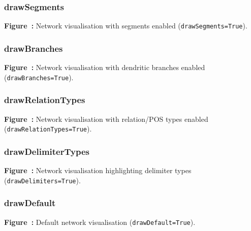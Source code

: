 \subsubsection{drawSegments}
\begin{center}

\par\smallskip
{}\label{fig:drawSegments}
\textbf{Figure~\thefigure:} Network visualisation with segments enabled (\texttt{drawSegments=True}).
\end{center}

\subsubsection{drawBranches}
\begin{center}

\par\smallskip
{}\label{fig:drawBranches}
\textbf{Figure~\thefigure:} Network visualisation with dendritic branches enabled (\texttt{drawBranches=True}).
\end{center}

\subsubsection{drawRelationTypes}
\begin{center}

\par\smallskip
{}\label{fig:drawRelationTypes}
\textbf{Figure~\thefigure:} Network visualisation with relation/POS types enabled (\texttt{drawRelationTypes=True}).
\end{center}

\subsubsection{drawDelimiterTypes}
\begin{center}

\par\smallskip
{}\label{fig:drawDelimiterTypes}
\textbf{Figure~\thefigure:} Network visualisation highlighting delimiter types (\texttt{drawDelimiters=True}).
\end{center}

\subsubsection{drawDefault}
\begin{center}

\par\smallskip
{}\label{fig:drawDefault}
\textbf{Figure~\thefigure:} Default network visualisation (\texttt{drawDefault=True}).
\end{center}


